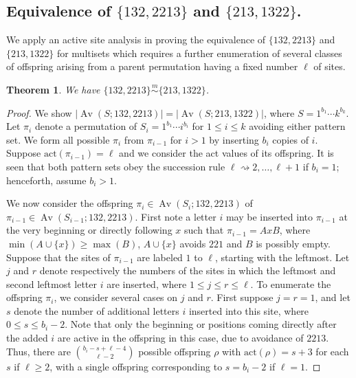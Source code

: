 \documentclass[11pt]{amsart}
\theoremstyle{plain}
\newtheorem{theorem}{Theorem}[section]
\theoremstyle{definition}
\newcommand{\csim}{\stackrel{m}{\sim}}
\DeclareMathOperator{\Av}{Av}
\begin{document}
\subsection{Equivalence of \texorpdfstring{$\{132,2213\}$}{\{132,2213\}} and
\texorpdfstring{$\{213,1322\}$}{\{213,1322\}}.}

We apply an active site analysis in proving the equivalence of $\{132,2213\}$ and $\{213,1322\}$ for
multisets which requires a further enumeration of several classes of offspring arising from a parent
permutation having a fixed number $\ell$ of sites.

\begin{theorem}\label{132,2213}
 We have $\{132,2213\}\csim\{213,1322\}$.
\end{theorem}
\begin{proof}
We show $|\Av(S;132,2213)|=|\Av(S;213,1322)|$, where $S=1^{b_1}\cdots k^{b_k}$.  Let $\pi_i$
denote a permutation of $S_i=1^{b_1}\cdots i^{b_i}$ for $1 \leq i \leq k$ avoiding either pattern
set.  We form all possible $\pi_i$ from $\pi_{i-1}$ for $i>1$ by inserting $b_i$ copies of $i$.
Suppose $\text{act}(\pi_{i-1})=\ell$ and we consider the act values of its offspring.  It is seen
that both pattern sets obey the succession rule $\ell \rightsquigarrow 2,\ldots,\ell+1$ if $b_i=1$;
henceforth, assume $b_i>1$.

We now consider the offspring $\pi_i\in \Av(S_i;132,2213)$ of $\pi_{i-1}\in
\Av(S_{i-1};132,2213)$.  First note a letter $i$ may be inserted into $\pi_{i-1}$ at the very
beginning or directly following $x$ such that $\pi_{i-1}=AxB$, where $\min(A\cup\{x\})\geq \max(B)$,
$A\cup\{x\}$ avoids $221$ and $B$ is possibly empty. Suppose that the sites of $\pi_{i-1}$ are
labeled $1$ to $\ell$, starting with the leftmost.  Let $j$ and $r$ denote respectively the numbers
of the sites in which the leftmost and second leftmost letter $i$ are inserted, where $1 \leq j \leq
r \leq \ell$.  To enumerate the offspring $\pi_i$, we consider several cases on $j$ and $r$.  First
suppose $j=r=1$, and let $s$ denote the number of additional letters $i$  inserted into this site,
where $0 \leq s \leq b_i-2$.  Note that only the beginning or positions coming directly after the
added $i$ are active in the offspring in this case, due to avoidance of $2213$.  Thus, there are
$\binom{b_i-s+\ell-4}{\ell-2}$ possible offspring $\rho$ with $\text{act}(\rho)=s+3$ for each $s$ if
$\ell \geq 2$, with a single offspring corresponding to $s=b_i-2$ if $\ell=1$.


\end{proof}
\end{document}
